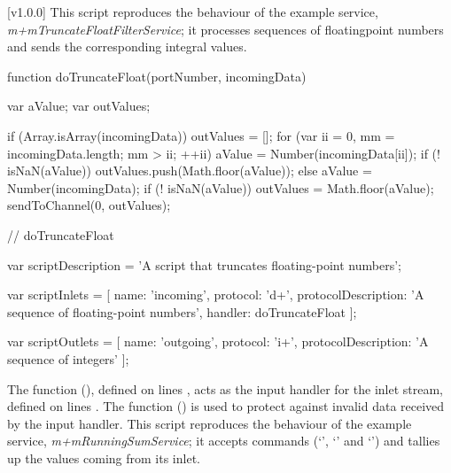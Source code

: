 [v1.0.0]
This script reproduces the behaviour of the example service,
\emph{m+mTruncateFloatFilterService}; it processes sequences of floating\longDash{}point
numbers and sends the corresponding integral values.
\codeBegin
\begin{listing}[5]{1}
function doTruncateFloat(portNumber, incomingData)
{
    var aValue;
    var outValues;
    
    if (Array.isArray(incomingData))
    {
        outValues = [];
        for (var ii = 0, mm = incomingData.length; mm > ii; ++ii)
        {
            aValue = Number(incomingData[ii]);
            if (! isNaN(aValue))
            {
                outValues.push(Math.floor(aValue));
            }
        }
    }
    else
    {
        aValue = Number(incomingData);
        if (! isNaN(aValue))
        {
            outValues = Math.floor(aValue);
        }
    }
    sendToChannel(0, outValues);
} // doTruncateFloat

var scriptDescription = 'A script that truncates floating-point numbers';

var scriptInlets = [ { name: 'incoming', protocol: 'd+',
                        protocolDescription: 'A sequence of floating-point numbers',
                        handler: doTruncateFloat } ];

var scriptOutlets = [ { name: 'outgoing', protocol: 'i+',
                        protocolDescription: 'A sequence of integers' } ];
\end{listing}
\codeEnd{}
The function (), defined on lines \longDash{},
acts as the input handler for the inlet stream, defined on lines
\longDash{}.
The function () is used to protect against invalid data received by the
input handler.
\secondaryEnd
\condPage
{}
This script reproduces the behaviour of the example service,
\emph{m+mRunningSumService}; it accepts commands (`', `'
and `') and tallies up the values coming from its inlet.
\codeBegin
